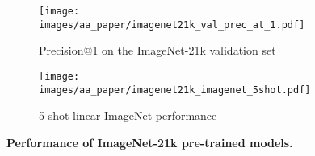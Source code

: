 \documentclass{article}
\begin{document}
\begin{figure}
\centering
\begin{subfigure}{\textwidth}
  \centering
  \texttt{[image: images/aa\_paper/imagenet21k\_val\_prec\_at\_1.pdf]}
  \caption{Precision@1 on the ImageNet-21k validation set}
  \label{im:imagenet21k_prec}
\end{subfigure}
\begin{subfigure}{\textwidth}
  \centering
  \texttt{[image: images/aa\_paper/imagenet21k\_imagenet\_5shot.pdf]}
  \caption{5-shot linear ImageNet performance}
  \label{im:imagenet21k_5shot}
\end{subfigure}
\caption{\textbf{Performance of ImageNet-21k pre-trained models.}}
\label{im:imagenet21k}
\end{figure}
 
\end{document}

